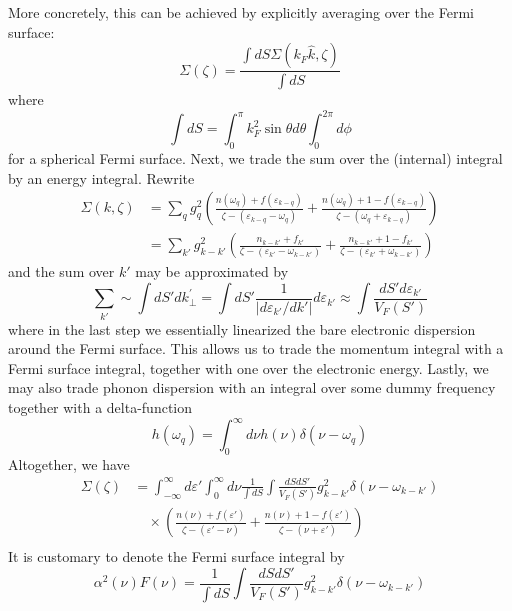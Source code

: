 More concretely, this can be achieved by explicitly averaging over the Fermi surface:
\[ \Sigma \left( \zeta \right) =\frac{\int{dS\Sigma \left( k_F\hat{k},\zeta \right)}}{\int{dS}}\]
where
\[ \int{dS}=\int_0^{\pi}{k_{F}^{2}\sin \theta d\theta \int_0^{2\pi}{d\phi}}\]
for a spherical Fermi surface. Next, we trade the sum over the (internal) integral by an energy integral. Rewrite
\begin{align*}
    \Sigma \left( k,\zeta \right) &=\sum_q{g_{q}^{2}\left( \frac{n\left( \omega _q \right) +f\left( \varepsilon _{k-q} \right)}{\zeta -\left( \varepsilon _{k-q}-\omega _q \right)}+\frac{n\left( \omega _q \right) +1-f\left( \varepsilon _{k-q} \right)}{\zeta -\left( \omega _q+\varepsilon _{k-q} \right)} \right)}\\
    &=\sum_{k'}{g_{k-k'}^{2}\left( \frac{n_{k-k'}+f_{k'}}{\zeta -\left( \varepsilon _{k'}-\omega _{k-k'} \right)}+\frac{n_{k-k'}+1-f_{k'}}{\zeta -\left( \varepsilon _{k'}+\omega _{k-k'} \right)} \right)}
\end{align*}
and the sum over $k\prime$ may be approximated by
\[ \sum_{k'}{}\sim \int{dS'dk_{\bot}^{'}}=\int{dS'\frac{1}{\left| d\varepsilon _{k'}/dk' \right|}d\varepsilon _{k'}}\approx \int{\frac{dS'd\varepsilon _{k'}}{V_F\left( S' \right)}}\]
where in the last step we essentially linearized the bare electronic dispersion around the Fermi surface. This allows us to trade the momentum integral with a Fermi surface integral, together with one over the electronic energy. Lastly, we may also trade phonon dispersion with an integral over some dummy frequency together with a delta-function
\[ h\left( \omega _q \right) =\int_0^{\infty}{d\nu h\left( \nu \right) \delta \left( \nu -\omega _q \right)}\]
Altogether, we have
\begin{align*}
    \Sigma \left( \zeta \right) &=\int_{-\infty}^{\infty}{d\varepsilon '\int_0^{\infty}{d\nu \frac{1}{\int{dS}}\int{\frac{dSdS'}{V_F\left( S' \right)}g_{k-k'}^{2}\delta \left( \nu -\omega _{k-k'} \right)}}}\\
    &\quad \times \left( \frac{n\left( \nu \right) +f\left( \varepsilon ' \right)}{\zeta -\left( \varepsilon '-\nu \right)}+\frac{n\left( \nu \right) +1-f\left( \varepsilon ' \right)}{\zeta -\left( \nu +\varepsilon ' \right)} \right) \\
\end{align*}
It is customary to denote the Fermi surface integral by
\[ \alpha ^2\left( \nu \right) F\left( \nu \right) =\frac{1}{\int{dS}}\int{\frac{dSdS'}{V_F\left( S' \right)}g_{k-k'}^{2}\delta \left( \nu -\omega _{k-k'} \right)}\]
